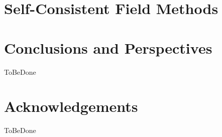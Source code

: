 \documentclass[12pt]{article}
\begin{document}
\section{Self-Consistent Field Methods}

\section{Conclusions and Perspectives}
ToBeDone

\section{Acknowledgements}
ToBeDone

\newpage


\end{document}
